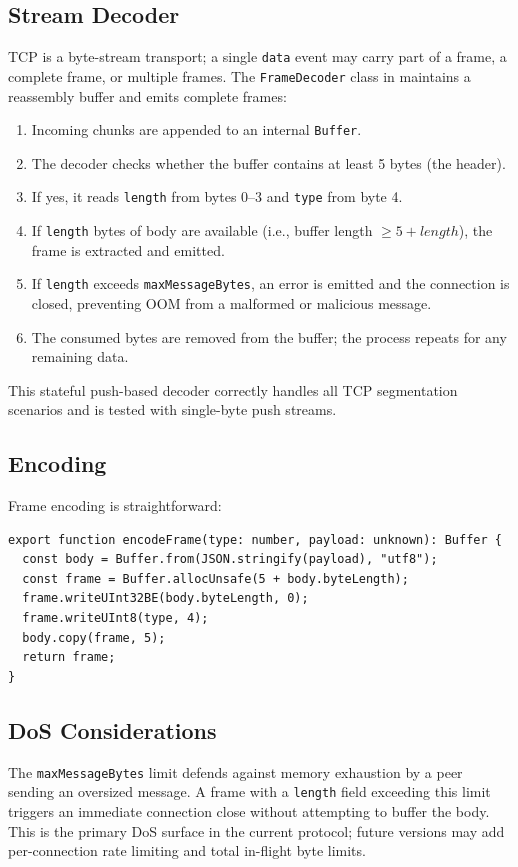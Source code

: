 \subsection{Stream Decoder}

TCP is a byte-stream transport; a single \texttt{data} event may carry part of
a frame, a complete frame, or multiple frames. The \texttt{FrameDecoder} class
in  maintains a reassembly buffer and emits complete frames:

\begin{enumerate}[leftmargin=1.5em]
  \item Incoming chunks are appended to an internal \texttt{Buffer}.
  \item The decoder checks whether the buffer contains at least 5 bytes (the
        header).
  \item If yes, it reads \texttt{length} from bytes 0--3 and \texttt{type}
        from byte 4.
  \item If \texttt{length} bytes of body are available (i.e., buffer length
        $\geq 5 + \mathit{length}$), the frame is extracted and emitted.
  \item If \texttt{length} exceeds \texttt{maxMessageBytes}, an error is emitted
        and the connection is closed, preventing OOM from a malformed or
        malicious message.
  \item The consumed bytes are removed from the buffer; the process repeats
        for any remaining data.
\end{enumerate}

This stateful push-based decoder correctly handles all TCP segmentation
scenarios and is tested with single-byte push streams.

\subsection{Encoding}

Frame encoding is straightforward:

\begin{lstlisting}[caption={Frame encoder (TypeScript).}]
export function encodeFrame(type: number, payload: unknown): Buffer {
  const body = Buffer.from(JSON.stringify(payload), "utf8");
  const frame = Buffer.allocUnsafe(5 + body.byteLength);
  frame.writeUInt32BE(body.byteLength, 0);
  frame.writeUInt8(type, 4);
  body.copy(frame, 5);
  return frame;
}
\end{lstlisting}

\subsection{DoS Considerations}

The \texttt{maxMessageBytes} limit defends against memory exhaustion by a peer
sending an oversized message. A frame with a \texttt{length} field exceeding
this limit triggers an immediate connection close without attempting to buffer
the body. This is the primary DoS surface in the current protocol; future
versions may add per-connection rate limiting and total in-flight byte limits.
